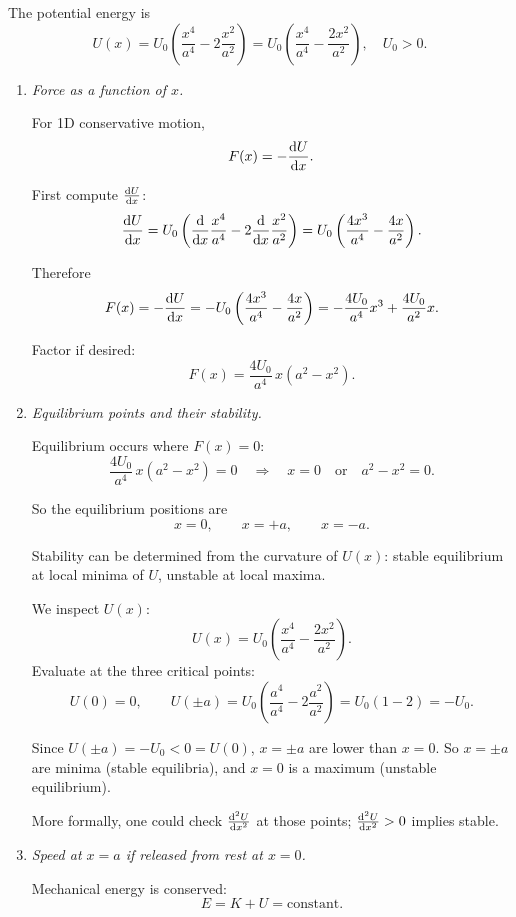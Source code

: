 \documentclass[../main.tex]{subfiles}
\begin{document}
\begin{enumerate}
The potential energy is
\[
U(x) = U_0 \left( \frac{x^4}{a^4} - 2 \frac{x^2}{a^2} \right)
= U_0 \left( \frac{x^4}{a^4} - \frac{2x^2}{a^2} \right)
,
\quad U_0>0.
\]

\begin{enumerate}
    \item \textit{Force as a function of $x$.}

    For 1D conservative motion,
    \[
    F(x) = - \dv{U}{x}.
    \]

    First compute $\dv{U}{x}$:
    \[
    \dv{U}{x}
    = U_0 \left(
    \dv{x} \frac{x^4}{a^4}
    - 2 \dv{x} \frac{x^2}{a^2}
    \right)
    = U_0 \left(
    \frac{4x^3}{a^4}
    - \frac{4x}{a^2}
    \right).
    \]

    Therefore
    \[
    F(x) = -\dv{U}{x}
    = - U_0 \left(
    \frac{4x^3}{a^4}
    - \frac{4x}{a^2}
    \right)
    = - \frac{4U_0}{a^4} x^3 + \frac{4U_0}{a^2} x.
    \]

    Factor if desired:
    \[
    F(x) = \frac{4U_0}{a^4} \, x \left( a^2 - x^2 \right).
    \]

    \item \textit{Equilibrium points and their stability.}

    Equilibrium occurs where $F(x)=0$:
    \[
    \frac{4U_0}{a^4} \, x \left( a^2 - x^2 \right) = 0
    \quad\Longrightarrow\quad
    x=0 \quad \text{or} \quad a^2-x^2 = 0.
    \]

    So the equilibrium positions are
    \[
    x = 0, \qquad x = +a, \qquad x = -a.
    \]

    Stability can be determined from the curvature of $U(x)$: stable equilibrium at local minima of $U$, unstable at local maxima.

    We inspect $U(x)$:
    \[
    U(x) = U_0 \left(\frac{x^4}{a^4} - \frac{2x^2}{a^2}\right).
    \]
    Evaluate at the three critical points:
    \[
    U(0) = 0,
    \qquad
    U(\pm a) = U_0 \left( \frac{a^4}{a^4} - 2\frac{a^2}{a^2} \right)
    = U_0 (1 - 2)
    = -U_0.
    \]

    Since $U(\pm a) = -U_0 < 0 = U(0)$, $x=\pm a$ are lower than $x=0$. So $x=\pm a$ are minima (stable equilibria), and $x=0$ is a maximum (unstable equilibrium).

    More formally, one could check $\dv[2]{U}{x}$ at those points; $\dv[2]{U}{x} >0$ implies stable.

    \item \textit{Speed at $x=a$ if released from rest at $x=0$.}

    Mechanical energy is conserved:
    \[
    E = K + U = \text{constant}.
    \]


\end{enumerate}
\end{enumerate}
\end{document}
